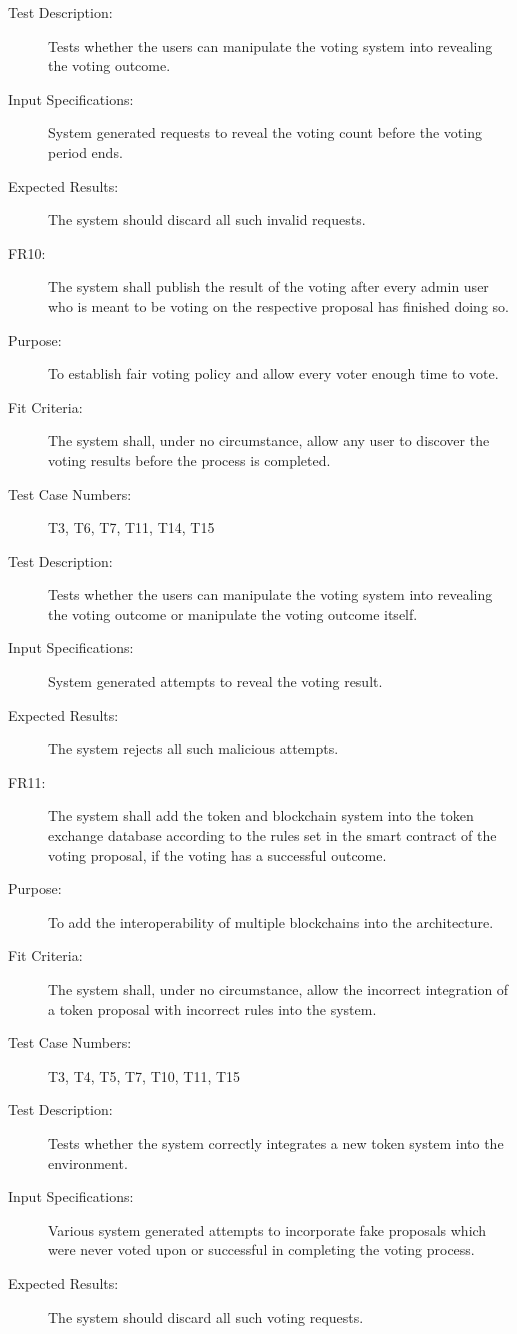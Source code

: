 \documentclass[a4paper,twoside,phd]{BYUPhys}
\begin{document}
\begin{description}
\item[Test Description:] Tests whether the users can manipulate the voting system into revealing the voting outcome.
\item[Input Specifications:] System generated requests to reveal the voting count before the voting period ends.
\item[Expected Results:] The system should discard all such invalid requests.
\\
\item[FR10:] The system shall publish the result of the voting after every admin user who is meant to be voting on the respective proposal has finished doing so.
\item[Purpose:] To establish fair voting policy and allow every voter enough time to vote.
\item[Fit Criteria:] The system shall, under no circumstance, allow any user to discover the voting results before the process is completed.
\item[Test Case Numbers:] T3, T6, T7, T11, T14, T15
\item[Test Description:] Tests whether the users can manipulate the voting system into revealing the voting outcome or manipulate the voting outcome itself.
\item[Input Specifications:] System generated attempts to reveal the voting result.
\item[Expected Results:] The system rejects all such malicious attempts.
\\
\item[FR11:] The system shall add the token and blockchain system into the token exchange database according to the rules set in the smart contract of the voting proposal, if the voting has a successful outcome.
\item[Purpose:] To add the interoperability of multiple blockchains into the architecture.
\item[Fit Criteria:] The system shall, under no circumstance, allow the incorrect integration of a token proposal with incorrect rules into the system.
\item[Test Case Numbers:] T3, T4, T5, T7, T10, T11, T15
\item[Test Description:] Tests whether the system correctly integrates a new token system into the environment.
\item[Input Specifications:] Various system generated attempts to incorporate fake proposals which were never voted upon or successful in completing the voting process.
\item[Expected Results:] The system should discard all such voting requests.

\end{description}
\end{document}
